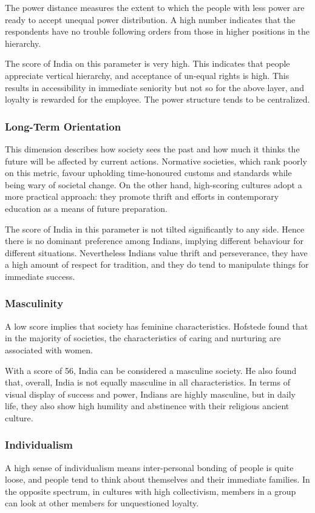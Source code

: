 \documentclass[12pt]{article}
\begin{document}
The power distance measures the extent to which the people with less power are ready to accept unequal power distribution. A high number indicates that the respondents have no trouble following orders from those in higher positions in the hierarchy.

The score of India on this parameter is very high. This indicates that people appreciate vertical hierarchy, and acceptance of un-equal rights is high. This results in accessibility in immediate seniority but not so for the above layer, and loyalty is rewarded for the employee. The power structure tends to be centralized.

\subsubsection{Long-Term Orientation}

This dimension describes how society sees the past and how much it thinks the future will be affected by current actions. Normative societies, which rank poorly on this metric, favour upholding time-honoured customs and standards while being wary of societal change. On the other hand, high-scoring cultures adopt a more practical approach: they promote thrift and efforts in contemporary education as a means of future preparation.

The score of India in this parameter is not tilted significantly to any side. Hence there is no dominant preference among Indians, implying different behaviour for different situations. Nevertheless Indians value thrift and perseverance, they have a high amount of respect for tradition, and they do tend to manipulate things for immediate success.

\subsubsection{Masculinity}

A low score implies that society has feminine characteristics. Hofstede found that in the majority of societies, the characteristics of caring and nurturing are associated with women.

With a score of 56, India can be considered a masculine society. He also found that, overall, India is not equally masculine in all characteristics. In terms of visual display of success and power, Indians are highly masculine, but in daily life, they also show high humility and abstinence with their religious ancient culture.

\subsubsection{Individualism}
A high sense of individualism means inter-personal bonding of people is quite loose, and people tend to think about themselves and their immediate families. In the opposite spectrum, in cultures with high collectivism, members in a group can look at other members for unquestioned loyalty.
\end{document}
